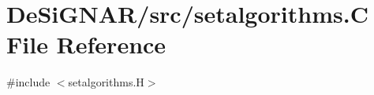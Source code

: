 \hypertarget{setalgorithms_8_c}{}\section{De\+Si\+G\+N\+A\+R/src/setalgorithms.C File Reference}
\label{setalgorithms_8_c}
{\ttfamily \#include $<$setalgorithms.\+H$>$}\newline

